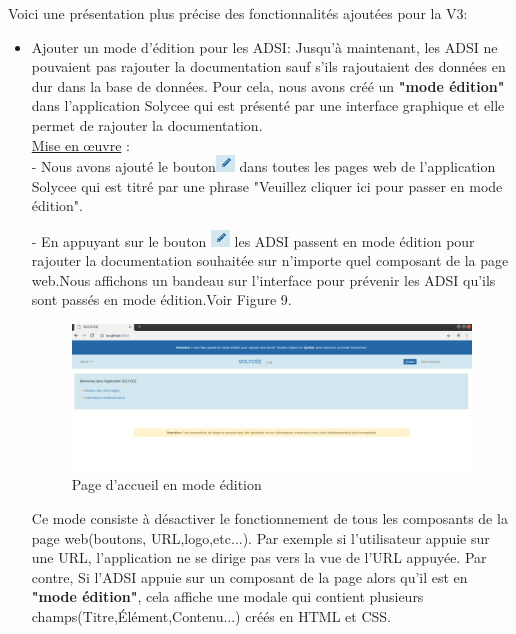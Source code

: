 \documentclass[12pt]{article}
\begin{document}
Voici une présentation plus précise des fonctionnalités ajoutées pour la V3:
 
\begin{itemize}
\item  Ajouter un mode d'édition pour les ADSI: Jusqu'à maintenant, les ADSI ne pouvaient pas rajouter la documentation sauf s'ils rajoutaient des données en dur dans la base de données. Pour cela, nous avons créé un \textbf{"mode édition"} dans l'application Solycee qui est présenté par une interface graphique et elle  permet de rajouter la documentation.\\


\underline{Mise en œuvre} : \\
- Nous avons ajouté le bouton\includegraphics[width=5mm,scale=0.5]{diagrammes/Bouton_modeEdition.png} dans toutes les pages web de l'application Solycee qui est titré par une  phrase "Veuillez cliquer ici pour passer en mode édition".

- En appuyant sur le bouton \includegraphics[width=5mm,scale=0.5]{diagrammes/Bouton_modeEdition.png} les ADSI passent en mode édition pour rajouter la documentation souhaitée sur n'importe quel composant de la page web.Nous affichons un bandeau sur l'interface pour prévenir les ADSI qu'ils sont passés en mode édition.Voir Figure 9.

\begin{figure}[H]
	\centering
 		\includegraphics[width=1\textwidth]{diagrammes/mode_edition.png} 
  		\caption{Page d'accueil en mode édition}
	\end{figure}
 
Ce mode consiste à désactiver le fonctionnement de tous les composants de la page web(boutons, URL,logo,etc...). Par exemple si l'utilisateur appuie sur une URL, l'application ne se dirige pas vers la vue de l'URL appuyée. Par contre, Si l'ADSI appuie sur un composant de la page alors qu'il est en \textbf{"mode édition"}, cela affiche une modale qui contient plusieurs champs(Titre,Élément,Contenu...) créés en HTML et CSS.


\end{itemize}
\end{document}
